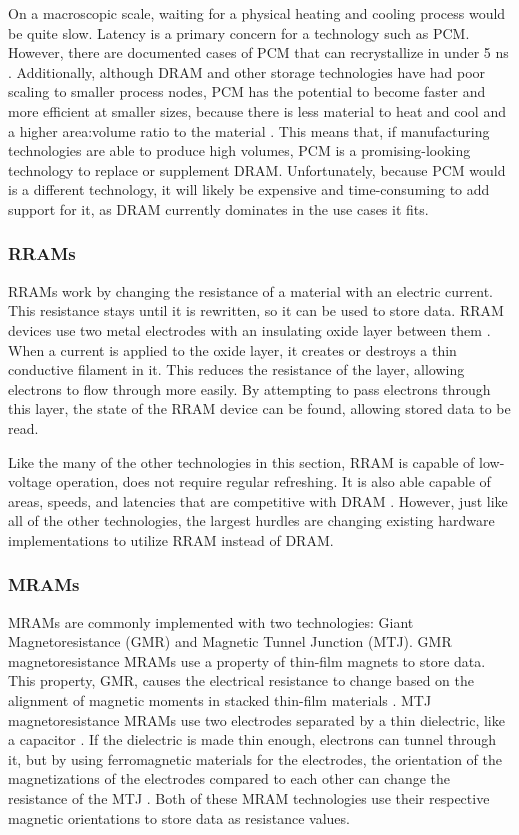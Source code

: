 \documentclass[doublespace,nopageskip]{VTthesis}
\begin{document}
On a macroscopic scale, waiting for a physical heating and cooling process would be quite slow. Latency is a primary concern for a technology such as PCM. However, there are documented cases of PCM that can recrystallize in under 5 ns \cite{fastswitchingpcm}. Additionally, although DRAM and other storage technologies have had poor scaling to smaller process nodes, PCM has the potential to become faster and more efficient at smaller sizes, because there is less material to heat and cool and a higher area:volume ratio to the material \cite{fastswitchingpcm}. This means that, if manufacturing technologies are able to produce high volumes, PCM is a promising-looking technology to replace or supplement DRAM. Unfortunately, because PCM would is a different technology, it will likely be expensive and time-consuming to add support for it, as DRAM currently dominates in the use cases it fits.

\subsubsection{RRAMs}\label{sss:rrams}
RRAMs work by changing the resistance of a material with an electric current. This resistance stays until it is rewritten, so it can be used to store data. RRAM devices use two metal electrodes with an insulating oxide layer between them \cite{rramoverview}. When a current is applied to the oxide layer, it creates or destroys a thin conductive filament in it. This reduces the resistance of the layer, allowing electrons to flow through more easily. By attempting to pass electrons through this layer, the state of the RRAM device can be found, allowing stored data to be read.

Like the many of the other technologies in this section, RRAM is capable of low-voltage operation, does not require regular refreshing. It is also able capable of areas, speeds, and latencies that are competitive with DRAM \cite{rram}. However, just like all of the other technologies, the largest hurdles are changing existing hardware implementations to utilize RRAM instead of DRAM.

\subsubsection{MRAMs}\label{sss:mrams}
MRAMs are commonly implemented with two technologies: Giant Magnetoresistance (GMR) and Magnetic Tunnel Junction (MTJ). GMR magnetoresistance MRAMs use a property of thin-film magnets to store data. This property, GMR, causes the electrical resistance to change based on the alignment of magnetic moments in stacked thin-film materials \cite{gmrphysics}. MTJ magnetoresistance MRAMs use two electrodes separated by a thin dielectric, like a capacitor \cite{gmrphysics}. If the dielectric is made thin enough, electrons can tunnel through it, but by using ferromagnetic materials for the electrodes, the orientation of the magnetizations of the electrodes compared to each other can change the resistance of the MTJ \cite{gmrphysics}. Both of these MRAM technologies use their respective magnetic orientations to store data as resistance values.
\end{document}
